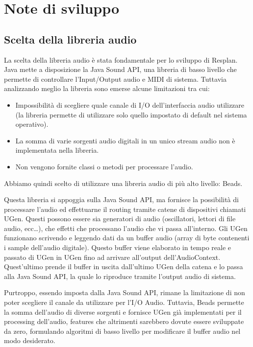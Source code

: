 \documentclass[a4paper,12pt]{report}
\begin{document}
\section{Note di sviluppo}
\subsection{Scelta della libreria audio}
La scelta della libreria audio è stata fondamentale per lo sviluppo di Resplan.
Java mette a disposizione la Java Sound API, una libreria di basso livello che permette di controllare l’Input/Output audio e MIDI di sistema. 
Tuttavia analizzando meglio la libreria sono emerse alcune limitazioni tra cui:
\begin{itemize}
    \item Impossibilità di scegliere quale canale di I/O dell’interfaccia audio utilizzare (la libreria permette di utilizzare solo quello impostato di default nel sistema operativo).
    \item La somma di varie sorgenti audio digitali in un unico stream audio non è implementata nella libreria.
    \item Non vengono fornite classi o metodi per processare l’audio.
\end{itemize}
Abbiamo quindi scelto di utilizzare una libreria audio di più alto livello: Beads.

Questa libreria si appoggia sulla Java Sound API, ma fornisce la possibilità di processare l’audio ed effettuarne il routing tramite catene di dispositivi chiamati UGen.
Questi possono essere sia generatori di audio (oscillatori, lettori di file audio, ecc…), che effetti che processano l’audio che vi passa all’interno.
Gli UGen funzionano scrivendo e leggendo dati da un buffer audio (array di byte contenenti i sample dell’audio digitale). Questo buffer viene elaborato in tempo reale e passato di UGen in UGen fino ad arrivare all’output dell’AudioContext. Quest’ultimo prende il buffer in uscita dall’ultimo UGen della catena e lo passa alla Java Sound API, la quale lo riproduce tramite l’output audio di sistema.

Purtroppo, essendo imposta dalla Java Sound API, rimane la limitazione di non poter scegliere il canale da utilizzare per l’I/O Audio. Tuttavia, Beads permette la somma dell’audio di diverse sorgenti e fornisce UGen già implementati per il processing dell’audio, features che altrimenti sarebbero dovute essere sviluppate da zero, formulando algoritmi di basso livello per modificare il buffer audio nel modo desiderato.
\endsubsection
\end{document}
